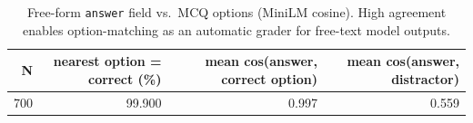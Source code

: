 \begin{table}[t]
\centering
\small
\caption{Free-form \texttt{answer} field vs.\ MCQ options (MiniLM cosine). High agreement enables option-matching as an automatic grader for free-text model outputs.}
\label{tab:answer_match}
\begin{tabular}{rrrr}
\toprule
N & nearest option = correct (\%) & mean cos(answer, correct option) & mean cos(answer, distractor) \\
\midrule
700 & 99.900 & 0.997 & 0.559 \\
\bottomrule
\end{tabular}
\end{table}
